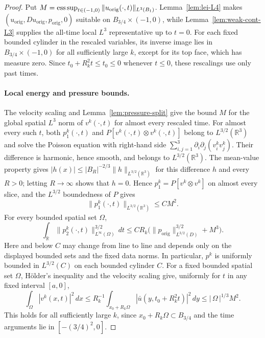 \documentclass[11pt,letterpaper]{article}
\numberwithin{equation}{section}
\theoremstyle{plain}
\theoremstyle{definition}
\theoremstyle{remark}
\begin{document}
\begin{proof}
Put \(M=\operatorname*{ess\,sup}_{t\in(-1,0)}\|u_{\mathrm{orig}}(\cdot,t)\|_{L^3(B_1)}\). Lemma~\ref{lem:lei-L4} makes \((u_{\mathrm{orig}},Du_{\mathrm{orig}},p_{\mathrm{orig}},0)\) suitable on \(B_{3/4}\times(-1,0)\), while Lemma~\ref{lem:weak-cont-L3} supplies the all-time local \(L^3\) representative up to \(t=0\). For each fixed bounded cylinder in the rescaled variables, its inverse image lies in \(B_{3/4}\times(-1,0)\) for all sufficiently large \(k\), except for its top face, which has measure zero. Since \(t_0+R_k^2t\le t_0\le0\) whenever \(t\le0\), these rescalings use only past times.

\paragraph{Local energy and pressure bounds.}
The velocity scaling and Lemma~\ref{lem:pressure-split} give the bound $M$ for the global spatial $L^3$ norm of $v^k(\cdot,t)$ for almost every rescaled time. For almost every such $t$, both $p_1^k(\cdot,t)$ and $P[v^k(\cdot,t)\otimes v^k(\cdot,t)]$ belong to $L^{3/2}(\mathbb R^3)$ and solve the Poisson equation with right-hand side $\sum_{i,j=1}^3\partial_i\partial_j(v_i^kv_j^k)$. Their difference is harmonic, hence smooth, and belongs to $L^{3/2}(\mathbb R^3)$. The mean-value property gives $|h(x)|\le |B_R|^{-2/3}\|h\|_{L^{3/2}(\mathbb R^3)}$ for this difference $h$ and every $R>0$; letting $R\to\infty$ shows that $h=0$. Hence $p_1^k=P[v^k\otimes v^k]$ on almost every slice, and the $L^{3/2}$ boundedness of $P$ gives
\begin{equation*}
 \|p_1^k(\cdot,t)\|_{L^{3/2}(\mathbb R^3)}\le C M^2.
\end{equation*}
For every bounded spatial set \(\Omega\),
\begin{equation*}
 \int_{\mathbb R}\|p_2^k(\cdot,t)\|_{L^\infty(\Omega)}^{3/2}\,dt
 \le C R_k\bigl(\|p_{\mathrm{orig}}\|_{L^{3/2}(D)}^{3/2}+M^3\bigr).
\end{equation*}
Here and below \(C\) may change from line to line and depends only on the displayed bounded sets and the fixed data norms. In particular, \(p^k\) is uniformly bounded in \(L^{3/2}(C)\) on each bounded cylinder \(C\). For a fixed bounded spatial set \(\Omega\), Hölder's inequality and the velocity scaling give, uniformly for \(t\) in any fixed interval \([a,0]\),
\begin{equation}\label{eq:blowup-slice-bound}
 \int_\Omega |v^k(x,t)|^2\,dx
 \le R_k^{-1}\int_{x_0+R_k\Omega}|\bar u(y,t_0+R_k^2t)|^2\,dy
 \le |\,\Omega\,|^{1/3}M^2.
\end{equation}
This holds for all sufficiently large \(k\), since \(x_0+R_k\Omega\subset B_{3/4}\) and the time arguments lie in \([-(3/4)^2,0]\).


\end{proof}
\end{document}
